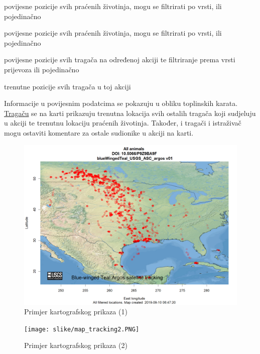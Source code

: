 \begin{packed_item}
\begin{packed_item}
	\item[a)] povijesne pozicije svih praćenih životinja, mogu se filtrirati po vrsti, ili pojedinačno
	\item[b)] povijesne pozicije svih praćenih životinja, mogu se filtrirati po vrsti, ili pojedinačno
	\item[c)] povijesne pozicije svih tragača na određenoj akciji te filtriranje prema vrsti prijevoza ili pojedinačno 
	\item[d)] trenutne pozicije svih tragača u toj akciji 
	
\end{packed_item}

Informacije u povijesnim podatcima se pokazuju u obliku toplinskih karata.
\underline{Tragaču} se na karti prikazuju trenutna lokacija svih ostalih tragača koji sudjeluju u akciji te trenutnu lokaciju praćenih životinja.
 Također, i tragači i istraživač mogu ostaviti komentare za ostale sudionike u akciji na karti.
 
		\begin{figure}[H]
			\includegraphics[scale=0.4]{slike/map_tracking.PNG} %
			\centering
			\caption{Primjer kartografskog prikaza (1)}
			\label{fig:promjene}
		\end{figure}


		\begin{figure}[H]
			\texttt{[image: slike/map\_tracking2.PNG]} %
			\centering
			\caption{Primjer kartografskog prikaza (2)}
			\label{fig:promjene}
		\end{figure}


\end{packed_item}



		